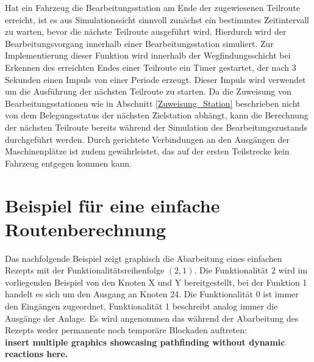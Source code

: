 			Hat ein Fahrzeug die Bearbeitungsstation am Ende der zugewiesenen Teilroute erreicht, ist es aus Simulationssicht sinnvoll zunächst ein bestimmtes Zeitintervall zu warten, bevor die nächste Teilroute ausgeführt wird. Hierdurch wird der Bearbeitungsvorgang innerhalb einer Bearbeitungsstation simuliert. Zur Implementierung dieser Funktion wird innerhalb der Wegfindungsschicht bei Erkennen des erreichten Endes einer Teilroute ein Timer gestartet, der nach 3 Sekunden einen Impuls von einer Periode erzeugt. Dieser Impuls wird verwendet um die Ausführung der nächsten Teilroute zu starten. Da die Zuweisung von Bearbeitungsstationen wie in Abschnitt \ref{Zuweisung_Station} beschrieben nicht von dem Belegungsstatus der nächsten Zielstation abhängt, kann die Berechnung der nächsten Teilroute bereits während der Simulation des Bearbeitungszustands durchgeführt werden. Durch gerichtete Verbindungen an den Ausgängen der Maschinenplätze ist zudem gewährleistet, das auf der ersten Teilstrecke kein Fahrzeug entgegen kommen kann.
	
		
	\section{Beispiel für eine einfache Routenberechnung}
	
		Das nachfolgende Beispiel zeigt graphisch die Abarbeitung eines einfachen Rezepts mit der Funktionalitätsreihenfolge $(2,1)$. Die Funktionalität 2 wird im vorliegenden Beispiel von den Knoten X und Y bereitgestellt, bei der Funktion 1 handelt es sich um den Ausgang an Knoten 24. Die Funktionalität 0 ist immer den Eingängen zugeordnet, Funktionalität 1 beschreibt analog immer die Ausgänge der Anlage. Es wird angenommen das während der Abarbeitung des Rezepts weder permanente noch temporäre Blockaden auftreten:\\
		\textbf{insert multiple graphics showcasing pathfinding without dynamic reactions here.}